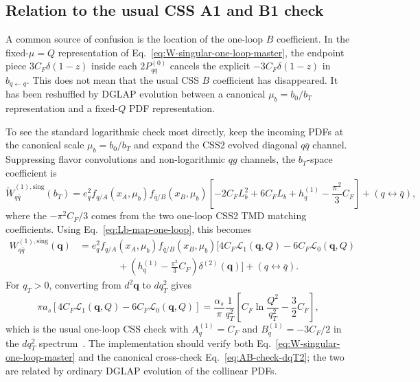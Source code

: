 \documentclass[11pt]{article}
\newcommand{\bq}{\bm{q}}
\newcommand{\deltaT}{\delta^{(2)}}
\newcommand{\sing}{\mathrm{sing}}
\begin{document}
\subsection{Relation to the usual CSS A1 and B1 check}
\label{subsec:AB-check}

A common source of confusion is the location of the one-loop $B$ coefficient. In the
fixed-$\mu=Q$ representation of Eq.~\eqref{eq:W-singular-one-loop-master}, the endpoint
piece $3C_F\delta(1-z)$ inside each $2P_{qq}^{(0)}$ cancels the explicit
$-3C_F\delta(1-z)$ in $b_{q\leftarrow q}$. This does not mean that the usual CSS
$B$ coefficient has disappeared. It has been reshuffled by DGLAP evolution between a
canonical $\mu_b=b_0/b_T$ representation and a fixed-$Q$ PDF representation.

To see the standard logarithmic check most directly, keep the incoming PDFs at the
canonical scale $\mu_b=b_0/b_T$ and expand the CSS2 evolved diagonal $q\bar q$ channel.
Suppressing flavor convolutions and non-logarithmic $qg$ channels, the $b_T$-space
coefficient is
\begin{equation}
  \widetilde W_{q\bar q}^{(1),\sing}(b_T)
  =e_q^2 f_{q/A}(x_A,\mu_b)f_{\bar q/B}(x_B,\mu_b)
  \left[
    -2C_F L_b^2+6C_F L_b+h_q^{(1)}-\frac{\pi^2}{3}C_F
  \right]
  +(q\leftrightarrow\bar q),
  \label{eq:W-b-canonical-one-loop}
\end{equation}
where the $-\pi^2 C_F/3$ comes from the two one-loop CSS2 TMD matching coefficients.
Using Eq.~\eqref{eq:Lb-map-one-loop}, this becomes
\begin{align}
  W_{q\bar q}^{(1),\sing}(\bq)
  &=e_q^2 f_{q/A}(x_A,\mu_b)f_{\bar q/B}(x_B,\mu_b)
  \Bigg[
    4C_F\mathcal L_1(\bq,Q)-6C_F\mathcal L_0(\bq,Q)
    \\
  &\qquad\qquad
    +\left(h_q^{(1)}-\frac{\pi^2}{3}C_F\right)\deltaT(\bq)
  \Bigg]
  +(q\leftrightarrow\bar q).
  \label{eq:W-qbarq-canonical-one-loop-k}
\end{align}
For $q_T>0$, converting from $d^2\bq$ to $dq_T^2$ gives
\begin{equation}
  \pi a_s\left[4C_F\mathcal L_1(\bq,Q)-6C_F\mathcal L_0(\bq,Q)\right]
  =
  \frac{\alpha_s}{\pi}\frac{1}{q_T^2}
  \left[
    C_F\ln\!\frac{Q^2}{q_T^2}-\frac{3}{2}C_F
  \right],
  \label{eq:AB-check-dqT2}
\end{equation}
which is the usual one-loop CSS check with $A_q^{(1)}=C_F$ and
$B_q^{(1)}=-3C_F/2$ in the $dq_T^2$ spectrum~\cite{CSS1985,EllisVeseli1998}. The implementation should verify both
Eq.~\eqref{eq:W-singular-one-loop-master} and the canonical cross-check
Eq.~\eqref{eq:AB-check-dqT2}; the two are related by ordinary DGLAP evolution of the
collinear PDFs.
\end{document}
